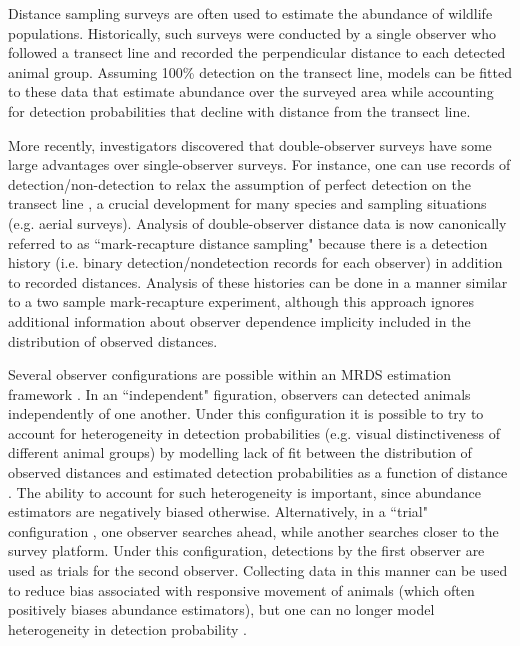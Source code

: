 \documentclass[12pt,fleqn]{article}
\begin{document}
Distance sampling surveys \citep{BurnhamEtAl1980,BucklandEtAl2001} are often used to estimate the abundance of wildlife populations.  Historically, such surveys were conducted by a single observer who followed a transect line and recorded the perpendicular distance to each detected animal group.  Assuming 100\% detection on the transect line, models can be fitted to these data that estimate abundance over the surveyed area while accounting for detection probabilities that decline with distance from the transect line.

More recently, investigators discovered that double-observer surveys have some large advantages over single-observer surveys.  For instance, one can use records of detection/non-detection to relax the assumption of perfect detection on the transect line \citep{BorchersEtAl1998}, a crucial development for many species and sampling situations (e.g. aerial surveys).  Analysis of double-observer distance data is now canonically referred to as ``mark-recapture distance sampling" \citep[MRDS; ][]{LaakeBorchers2004} because there is a detection history (i.e. binary detection/nondetection records for each observer) in addition to recorded distances. Analysis of these histories can be done in a manner similar to a two sample mark-recapture experiment, although this approach ignores additional information about observer dependence implicity included in the distribution of observed distances.

Several observer configurations are possible within an MRDS estimation framework \citep{BurtEtAl2014}.  In an ``independent" figuration, observers can detected animals independently of one another.  Under this configuration it is possible to try to account for heterogeneity in detection probabilities (e.g. visual distinctiveness of different animal groups) by modelling lack of fit between the distribution of observed distances and estimated detection probabilities as a function of distance \citep{LaakeBorchers2004,BorchersEtAl2006,BucklandEtAl2010}.  The ability to account for such heterogeneity is important, since abundance estimators are negatively biased otherwise. Alternatively, in a ``trial" configuration \citep{LaakeBorchers2004}, one observer searches ahead, while another searches closer to the survey platform.  Under this configuration, detections by the first observer are used as trials for the second observer.  Collecting data in this manner can be used to reduce bias associated with responsive movement of animals (which often positively biases abundance estimators), but one can no longer model heterogeneity in detection probability \citep{BurtEtAl2014}.
\end{document}
